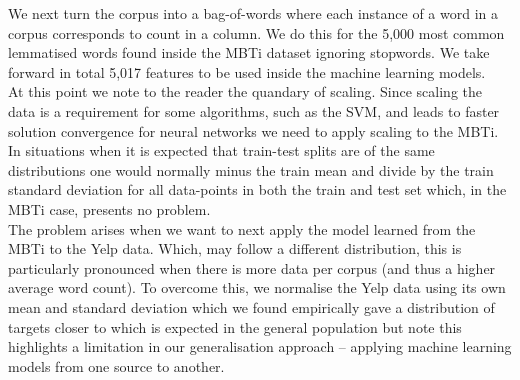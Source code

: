 \documentclass[sigconf, nonacm]{acmart}
\begin{document}
We next turn the corpus into a bag-of-words where each instance of a word in a corpus corresponds to count in a column. We do this for the 5,000 most common lemmatised words found inside the MBTi dataset ignoring stopwords. We take forward in total 5,017 features to be used inside the machine learning models. \\

At this point we note to the reader the quandary of scaling. Since scaling the data is a requirement for some algorithms, such as the SVM, and leads to faster solution convergence for neural networks \cite{lecun2012efficient} we need to apply scaling to the MBTi. In situations when it is expected that train-test splits are of the same distributions one would normally  minus the train mean and divide by the train standard deviation for all data-points in both the train and test set which, in the MBTi case, presents no problem. \\ 

The problem arises when we want to next apply the model learned from the MBTi to the Yelp data. Which, may follow a different distribution, this is particularly pronounced when there is more data per corpus (and thus a higher average word count). To overcome this, we normalise the Yelp data using its own mean and standard deviation which we found empirically gave a distribution of targets closer to which is expected in the general population but note this highlights a limitation in our generalisation approach -- applying machine learning models from one source to another. 
\end{document}
